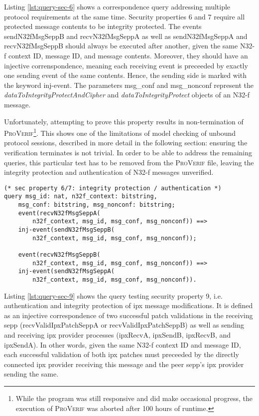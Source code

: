 Listing \ref{lst:query-sec-6} shows a correspondence query addressing multiple protocol requirements at the same time.
Security properties 6 and 7 require all protected message contents to be integrity protected.
The events {\sffamily sendN32fMsgSeppB} and {\sffamily recvN32fMsgSeppA} as well as {\sffamily sendN32fMsgSeppA} and {\sffamily recvN32fMsgSeppB} should always be executed after another, given the same N32-f context ID, message ID, and message contents.
Moreover, they should have an injective correnspondence, meaning each receiving event is preceeded by exactly one sending event of the same contents.
Hence, the sending side is marked with the keyword {\sffamily inj-event}.
The parameters {\sffamily msg\_conf} and {\sffamily msg\_nonconf} represent the \textit{dataToIntegrityProtectAndCipher} and \textit{dataToIntegrityProtect} objects of an N32-f message.

Unfortunately, attempting to prove this property results in non-termination of \textsc{ProVerif}\footnote{While the program was still responsive and did make occasional progress, the execution of \textsc{ProVerif} was aborted after 100 hours of runtime.}.
This shows one of the limitations of model checking of unbound protocol sessions, described in more detail in the following section: ensuring the verification terminates is not trivial.
In order to be able to address the remaining queries, this particular test has to be removed from the \textsc{ProVerif} file, leaving the integrity protection and authentication of N32-f messages unverified.

\begin{lstlisting}[caption={Query for security property 6 and 7},label={lst:query-sec-6},firstnumber=403]
(* sec property 6/7: integrity protection / authentication *)
query msg_id: nat, n32f_context: bitstring,
    msg_conf: bitstring, msg_nonconf: bitstring;
    event(recvN32fMsgSeppA(
        n32f_context, msg_id, msg_conf, msg_nonconf)) ==>
    inj-event(sendN32fMsgSeppB(
        n32f_context, msg_id, msg_conf, msg_nonconf));

    event(recvN32fMsgSeppB(
        n32f_context, msg_id, msg_conf, msg_nonconf)) ==>
    inj-event(sendN32fMsgSeppA(
        n32f_context, msg_id, msg_conf, msg_nonconf)).
\end{lstlisting}

Listing \ref{lst:query-sec-9} shows the query testing security property 9, i.e. authentication and integrity protection of \gls{ipx} message modifications.
It is defined as an injective correspondence of two successful patch validations in the receiving \gls{sepp} ({\sffamily recvValidIpxPatchSeppA} or {\sffamily recvValidIpxPatchSeppB}) as well as sending and receiving \gls{ipx} provider processes ({\sffamily ipxRecvA}, {\sffamily ipxSendB}, {\sffamily ipxRecvB}, and {\sffamily ipxSendA}).
In other words, given the same N32-f context ID and message ID, each successful validation of both \gls{ipx} patches must preceeded by the directly connected \gls{ipx} provider receiving this message and the peer \gls{sepp}'s \gls{ipx} provider sending the same.

